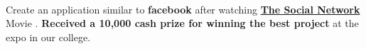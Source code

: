 \documentclass{deedy-resume-openfont}
\begin{document}
\begin{minipage}[t]{0.66\textwidth}
\\
\begin{tightemize}
\item Create an application similar to \textbf{facebook} after watching \textbf{\href{https://www.imdb.com/title/tt1285016/}{The Social Network}} Movie {}. \textbf{Received a {}10,000 cash prize for winning the best project} at the expo in our college.
\end{tightemize}
\sectionsep
\nocite{*}

\end{minipage} 
\end{document}
